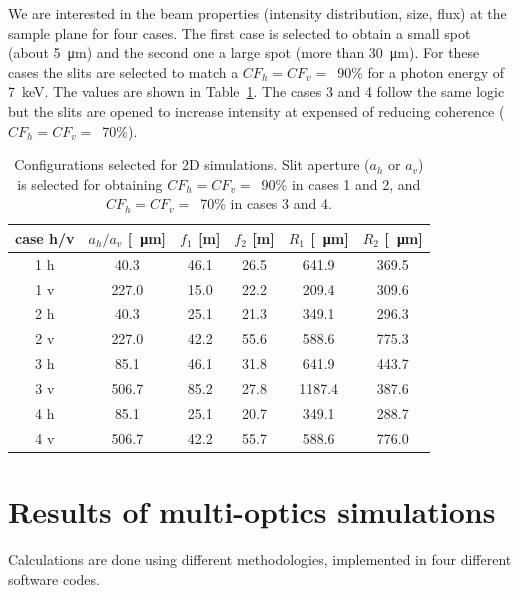 \documentclass{iucr}              %
\begin{document}
We are interested in the beam properties (intensity distribution, size, flux) at the sample plane for four cases.
The first case is selected to obtain a small spot (about \SI{5}{\micro\meter}) and the second one a large spot (more than \SI{30}{\micro\meter}). For these cases the slits are selected to match a $CF_h=CF_v=$~90\% for a photon energy of \SI{7}{keV}. The values are shown in Table~\ref{table:2Dusercases}. The cases 3 and 4 follow the same logic but the slits are opened to increase intensity at expensed of reducing coherence  ($CF_h=CF_v=$~70\%). 


\begin{table}[]
    \label{table:2Dusercases}
    \caption{Configurations selected for 2D simulations. Slit aperture ($a_h$ or $a_v$) is selected for obtaining $CF_h=CF_v=$~90\% in cases 1 and 2, and $CF_h=CF_v=$~70\% in cases 3 and 4. 
    }
    \begin{tabular}{c|c|c|c|c|c}
         case h/v & $a_h/a_v$ [\SI{}{\micro\meter}] & $f_1$ [m] & $f_2$ [m] & $R_1$ [\SI{}{\micro\meter}]& $R_2$ [\SI{}{\micro\meter}] \\
         \hline
1 h &      40.3 & 46.1 &     26.5 &     641.9 &     369.5 
\\
1 v &      227.0 & 15.0 &     22.2 &     209.4 &     309.6 
\\
\hline
2 h &      40.3 & 25.1 &     21.3 &     349.1 &     296.3  
\\
2 v &      227.0 & 42.2 &     55.6 &     588.6 &     775.3 
\\
\hline \hline
3 h &      85.1 & 46.1 &     31.8 &     641.9 &     443.7 
\\
3 v &      506.7 & 85.2 &     27.8 &     1187.4 &     387.6  
\\
\hline
4 h &      85.1 & 25.1 &     20.7 &     349.1 &     288.7 
\\
4 v &      506.7 & 42.2 &     55.7 &     588.6 &     776.0 

    \end{tabular}
\end{table}


\section{Results of multi-optics simulations}
\label{sec:complete-beamline}

Calculations are done using different methodologies, implemented in four different software codes. 
\end{document}
